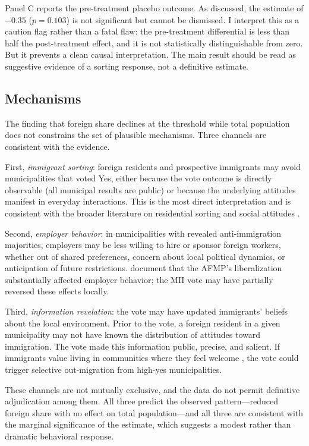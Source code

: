 \documentclass[12pt]{article}
\begin{document}
Panel C reports the pre-treatment placebo outcome. As discussed, the estimate of $-0.35$ ($p = 0.103$) is not significant but cannot be dismissed. I interpret this as a caution flag rather than a fatal flaw: the pre-treatment differential is less than half the post-treatment effect, and it is not statistically distinguishable from zero. But it prevents a clean causal interpretation. The main result should be read as suggestive evidence of a sorting response, not a definitive estimate.



\subsection{Mechanisms}

The finding that foreign share declines at the threshold while total population does not constrains the set of plausible mechanisms. Three channels are consistent with the evidence.

First, \textit{immigrant sorting}: foreign residents and prospective immigrants may avoid municipalities that voted Yes, either because the vote outcome is directly observable (all municipal results are public) or because the underlying attitudes manifest in everyday interactions. This is the most direct interpretation and is consistent with the broader literature on residential sorting and social attitudes \citep{card2001, amuedo2021}.

Second, \textit{employer behavior}: in municipalities with revealed anti-immigration majorities, employers may be less willing to hire or sponsor foreign workers, whether out of shared preferences, concern about local political dynamics, or anticipation of future restrictions. \citet{beerli2021} document that the AFMP's liberalization substantially affected employer behavior; the MII vote may have partially reversed these effects locally.

Third, \textit{information revelation}: the vote may have updated immigrants' beliefs about the local environment. Prior to the vote, a foreign resident in a given municipality may not have known the distribution of attitudes toward immigration. The vote made this information public, precise, and salient. If immigrants value living in communities where they feel welcome \citep{dustmann2007, facchini2008}, the vote could trigger selective out-migration from high-yes municipalities.

These channels are not mutually exclusive, and the data do not permit definitive adjudication among them. All three predict the observed pattern---reduced foreign share with no effect on total population---and all three are consistent with the marginal significance of the estimate, which suggests a modest rather than dramatic behavioral response.
\end{document}
